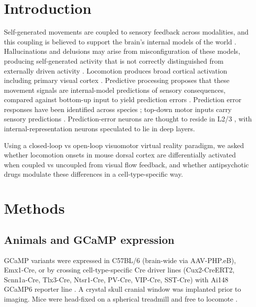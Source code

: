 \documentclass[11pt]{article}
\begin{document}
\section{Introduction}
Self-generated movements are coupled to sensory feedback across modalities, and this coupling is believed to support the brain's internal models of the world \cite{jordan1992forward}. Hallucinations and delusions may arise from misconfiguration of these models, producing self-generated activity that is not correctly distinguished from externally driven activity \cite{fletcher2009perceiving,frith2005consciousness}. Locomotion produces broad cortical activation \cite{musall2019singletrial,stringer2019spontaneous} including primary visual cortex \cite{keller2012sensorimotor,saleem2013integration,pakan2016behavioral}. Predictive processing proposes that these movement signals are internal-model predictions of sensory consequences, compared against bottom-up input to yield prediction errors \cite{jiang2021predictive,keller2018predictive}. Prediction error responses have been identified across species \cite{attinger2017visuomotor,audette2021modulation,ayaz2019layerspecific,eliades2008forward,heindorf2018mouse,keller2012sensorimotor,keller2009neural,stanley2007motor,zmarz2016mismatch}; top-down motor inputs carry sensory predictions \cite{leinweber2017sensorimotor,schneider2018movement}. Prediction-error neurons are thought to reside in L2/3 \cite{jordan2020layer,bastos2012canonical}, with internal-representation neurons speculated to lie in deep layers.

Using a closed-loop vs open-loop visuomotor virtual reality paradigm, we asked whether locomotion onsets in mouse dorsal cortex are differentially activated when coupled vs uncoupled from visual flow feedback, and whether antipsychotic drugs modulate these differences in a cell-type-specific way.

\section{Methods}
\subsection{Animals and GCaMP expression}
GCaMP variants were expressed in C57BL/6 (brain-wide via AAV-PHP.eB), Emx1-Cre, or by crossing cell-type-specific Cre driver lines (Cux2-CreERT2, Scnn1a-Cre, Tlx3-Cre, Ntsr1-Cre, PV-Cre, VIP-Cre, SST-Cre) with Ai148 GCaMP6 reporter line \cite{chan2017engineered,daigle2018suite}. A crystal skull cranial window \cite{kim2016longterm} was implanted prior to imaging. Mice were head-fixed on a spherical treadmill and free to locomote \cite{wekselblatt2016largescale}.
\end{document}
